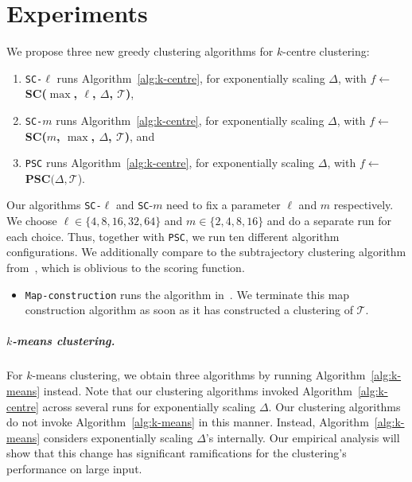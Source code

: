 \documentclass[english, thm-restate]{lipics-v2021}
\begin{document}
\section{Experiments}
\label{sec:experiments}

We propose three new greedy clustering algorithms for $k$-centre clustering:



\begin{enumerate}
    \item \texttt{SC-}$\ell$ runs Algorithm~\ref{alg:k-centre}, for exponentially scaling $\Delta$, with $f \gets $\textbf{SC($\max$, $\ell$, $\Delta$, $\mathcal{T}$)},
    \item \texttt{SC-}$m$ runs Algorithm~\ref{alg:k-centre}, for exponentially scaling $\Delta$, with $f \gets $ \textbf{SC($m$, $\max$, $\Delta$, $\mathcal{T}$)}, and
    \item \texttt{PSC} runs Algorithm~\ref{alg:k-centre}, for exponentially scaling $\Delta$,  with $f \gets $ $\textbf{PSC}(\Delta, \mathcal{T}$).
\end{enumerate}

\noindent
Our algorithms \texttt{SC-}$\ell$ and \texttt{SC}-$m$ need to fix a parameter $\ell$ and $m$ respectively. 
We choose $\ell \in \{ 4, 8, 16, 32, 64 \}$ and $m \in \{ 2, 4, 8, 16 \}$ and do a separate run for each choice. 
Thus, together with \texttt{PSC}, we run ten different algorithm configurations. 
We additionally compare to the subtrajectory clustering algorithm from~\cite{buchin2020improved}, which is oblivious to the scoring function.

\begin{itemize}
    \item \texttt{Map-construction} runs the algorithm in~\cite{buchin2020improved}. We terminate this map construction algorithm as soon as it has constructed a clustering of $\mathcal{T}$. 
\end{itemize}

\subparagraph{$k$-means clustering.}
For $k$-means clustering, we obtain three algorithms by running Algorithm~\ref{alg:k-means} instead. Note that our clustering algorithms invoked Algorithm~\ref{alg:k-centre} across several runs for exponentially scaling $\Delta$. Our clustering algorithms do not invoke Algorithm~\ref{alg:k-means} in this manner. Instead, Algorithm~\ref{alg:k-means} considers exponentially scaling $\Delta$'s internally.  Our empirical analysis will show that this change has significant ramifications for the clustering's performance on large input.
\end{document}
